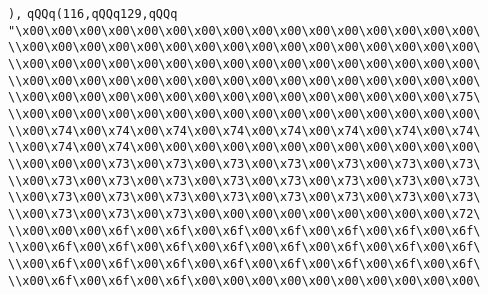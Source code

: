 \verb|),|\newline
\verb|qQQq(116,qQQq129,qQQq|\newline
\verb|"\x00\x00\x00\x00\x00\x00\x00\x00\x00\x00\x00\x00\x00\x00\x00\x00\|\newline
\verb|\\x00\x00\x00\x00\x00\x00\x00\x00\x00\x00\x00\x00\x00\x00\x00\x00\|\newline
\verb|\\x00\x00\x00\x00\x00\x00\x00\x00\x00\x00\x00\x00\x00\x00\x00\x00\|\newline
\verb|\\x00\x00\x00\x00\x00\x00\x00\x00\x00\x00\x00\x00\x00\x00\x00\x00\|\newline
\verb|\\x00\x00\x00\x00\x00\x00\x00\x00\x00\x00\x00\x00\x00\x00\x00\x75\|\newline
\verb|\\x00\x00\x00\x00\x00\x00\x00\x00\x00\x00\x00\x00\x00\x00\x00\x00\|\newline
\verb|\\x00\x74\x00\x74\x00\x74\x00\x74\x00\x74\x00\x74\x00\x74\x00\x74\|\newline
\verb|\\x00\x74\x00\x74\x00\x00\x00\x00\x00\x00\x00\x00\x00\x00\x00\x00\|\newline
\verb|\\x00\x00\x00\x73\x00\x73\x00\x73\x00\x73\x00\x73\x00\x73\x00\x73\|\newline
\verb|\\x00\x73\x00\x73\x00\x73\x00\x73\x00\x73\x00\x73\x00\x73\x00\x73\|\newline
\verb|\\x00\x73\x00\x73\x00\x73\x00\x73\x00\x73\x00\x73\x00\x73\x00\x73\|\newline
\verb|\\x00\x73\x00\x73\x00\x73\x00\x00\x00\x00\x00\x00\x00\x00\x00\x72\|\newline
\verb|\\x00\x00\x00\x6f\x00\x6f\x00\x6f\x00\x6f\x00\x6f\x00\x6f\x00\x6f\|\newline
\verb|\\x00\x6f\x00\x6f\x00\x6f\x00\x6f\x00\x6f\x00\x6f\x00\x6f\x00\x6f\|\newline
\verb|\\x00\x6f\x00\x6f\x00\x6f\x00\x6f\x00\x6f\x00\x6f\x00\x6f\x00\x6f\|\newline
\verb|\\x00\x6f\x00\x6f\x00\x6f\x00\x00\x00\x00\x00\x00\x00\x00\x00\x00\|\newline
